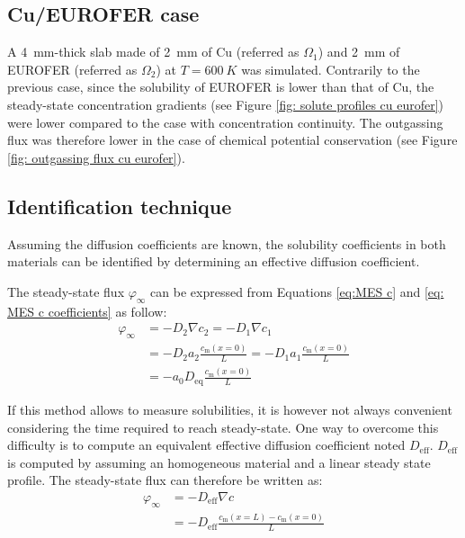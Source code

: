 \subsection{Cu/EUROFER case}

A \SI{4}{mm}-thick slab made of \SI{2}{mm} of Cu (referred as $\Omega_1$) and \SI{2}{mm} of EUROFER (referred as $\Omega_2$) at $T=\SI{600}{K}$ was simulated.
Contrarily to the previous case, since the solubility of EUROFER is lower than that of Cu, the steady-state concentration gradients (see Figure \ref{fig: solute profiles cu eurofer}) were lower compared to the case with concentration continuity.
The outgassing flux was therefore lower in the case of chemical potential conservation (see Figure \ref{fig: outgassing flux cu eurofer}).



\subsection{Identification technique}
Assuming the diffusion coefficients are known, the solubility coefficients in both materials can be identified by determining an effective diffusion coefficient.

The steady-state flux $\varphi_\infty$ can be expressed from Equations \ref{eq:MES c} and \ref{eq: MES c coefficients} as follow:
\begin{subequations}
    \begin{align}
        \varphi_\infty &= -D_2 \nabla c_2 =  -D_1 \nabla c_1 \\
        &= -D_2 a_2 \frac{c_\mathrm{m}(x=0)}{L} = -D_1 a_1 \frac{c_\mathrm{m}(x=0)}{L}\\
        &= -a_0 D_\mathrm{eq} \frac{c_\mathrm{m}(x=0)}{L}
    \end{align}
    \label{eq: steady state flux 1}
\end{subequations}

If this method allows to measure solubilities, it is however not always convenient considering the time required to reach steady-state.
One way to overcome this difficulty is to compute an equivalent effective diffusion coefficient noted $D_\mathrm{eff}$.
$D_\mathrm{eff}$ is computed by assuming an homogeneous material and a linear steady state profile.
The steady-state flux can therefore be written as:
\begin{subequations}
    \begin{align}
        \varphi_\infty &= -D_\mathrm{eff} \nabla c \\
        &= -D_\mathrm{eff} \frac{c_\mathrm{m}(x=L) - c_\mathrm{m}(x=0)}{L} \\
    \end{align}
    \label{eq: steady state flux 2}
\end{subequations}

